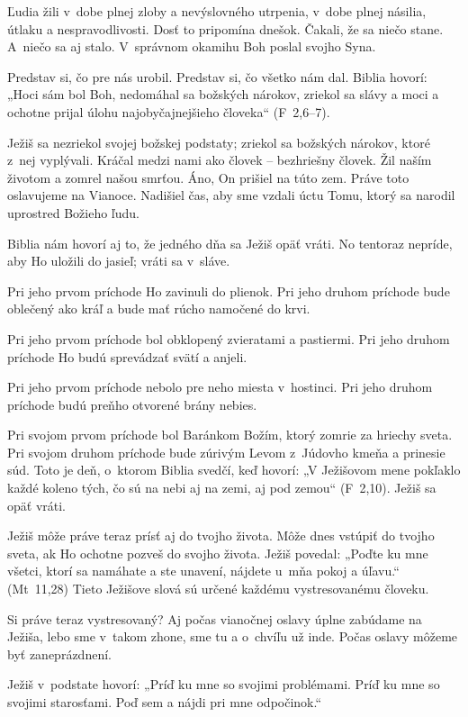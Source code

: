 Ľudia žili v~dobe plnej zloby a nevýslovného utrpenia, v~dobe plnej násilia, útlaku a nespravodlivosti. Dosť to pripomína dnešok. Čakali, že sa niečo stane. A~niečo sa aj stalo. V~správnom okamihu Boh poslal svojho Syna.

Predstav si, čo pre nás urobil. Predstav si, čo všetko nám dal. Biblia hovorí: „Hoci sám bol Boh, nedomáhal sa božských nárokov, zriekol sa slávy a moci a ochotne prijal úlohu najobyčajnejšieho človeka“ (F~2,6–7).

Ježiš sa nezriekol svojej božskej podstaty; zriekol sa božských nárokov, ktoré z~nej vyplývali. Kráčal medzi nami ako človek -- bezhriešny človek. Žil naším životom a zomrel našou smrťou. Áno, On prišiel na túto zem. Práve toto oslavujeme na Vianoce. Nadišiel čas, aby sme vzdali úctu Tomu, ktorý sa narodil uprostred Božieho ľudu.

Biblia nám hovorí aj to, že jedného dňa sa Ježiš opäť vráti. No tentoraz nepríde, aby Ho uložili do jasieľ; vráti sa v~sláve.

Pri jeho prvom príchode Ho zavinuli do plienok. Pri jeho druhom príchode bude oblečený ako kráľ a bude mať rúcho namočené do krvi.

Pri jeho prvom príchode bol obklopený zvieratami a pastiermi. Pri jeho druhom príchode Ho budú sprevádzať svätí a anjeli.

Pri jeho prvom príchode nebolo pre neho miesta v~hostinci. Pri jeho druhom príchode budú preňho otvorené brány nebies.

Pri svojom prvom príchode bol Baránkom Božím, ktorý zomrie za hriechy sveta. Pri svojom druhom príchode bude zúrivým Levom z~Júdovho kmeňa a prinesie súd. Toto je deň, o~ktorom Biblia svedčí, keď hovorí: „V Ježišovom mene pokľaklo každé koleno tých, čo sú na nebi aj na zemi, aj pod zemou“ (F~2,10). Ježiš sa opäť vráti.

Ježiš môže práve teraz prísť aj do tvojho života. Môže dnes vstúpiť do tvojho sveta, ak Ho ochotne pozveš do svojho života. Ježiš povedal: „Poďte ku mne všetci, ktorí sa namáhate a ste unavení, nájdete u~mňa pokoj a úľavu.“ (Mt~11,28) Tieto Ježišove slová sú určené každému vystresovanému človeku.

Si práve teraz vystresovaný? Aj počas vianočnej oslavy úplne zabúdame na Ježiša, lebo sme v~takom zhone, sme tu a o~chvíľu už inde. Počas oslavy môžeme byť zaneprázdnení.

Ježiš v~podstate hovorí: „Príď ku mne so svojimi problémami. Príď ku mne so svojimi starosťami. Poď sem a nájdi pri mne odpočinok.“

